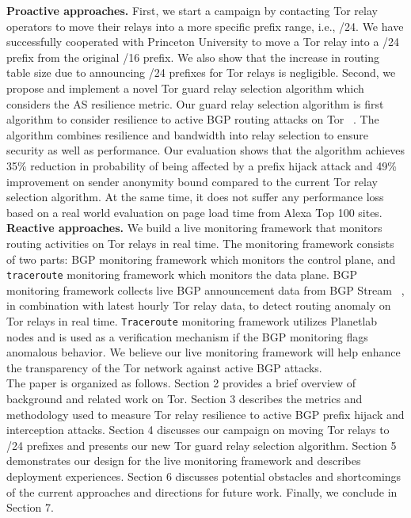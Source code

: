\textbf{Proactive approaches.} First, we start a campaign by contacting Tor relay operators to move their relays into a more specific prefix range, i.e., /24. We have successfully cooperated with Princeton University to move a Tor relay into a /24 prefix from the original /16 prefix. We also show that the increase in routing table size due to announcing /24 prefixes for Tor relays is negligible. Second, we propose and implement a novel Tor guard relay selection algorithm which considers the AS resilience metric. Our guard relay selection algorithm is first algorithm to consider resilience to active BGP routing attacks on Tor ~\cite{sun2015raptor}. The algorithm combines resilience and bandwidth into relay selection to ensure security as well as performance. Our evaluation shows that the algorithm achieves 35\% reduction in probability of being affected by a prefix hijack attack and 49\% improvement on sender anonymity bound compared to the current Tor relay selection algorithm. At the same time, it does not suffer any performance loss based on a real world evaluation on page load time from Alexa Top 100 sites. 
\\
\textbf{Reactive approaches.} We build a live monitoring framework that monitors routing activities on Tor relays in real time. The monitoring framework consists of two parts: BGP monitoring framework which monitors the control plane, and {\tt traceroute} monitoring framework which monitors the data plane. BGP monitoring framework collects live BGP announcement data from BGP Stream ~\cite{bgpstream}, in combination with latest hourly Tor relay data, to detect routing anomaly on Tor relays in real time. {\tt Traceroute}  monitoring framework utilizes Planetlab nodes and is used as a verification mechanism if the BGP monitoring flags anomalous behavior. We believe our live monitoring framework will help enhance the transparency of the Tor network against active BGP attacks.
\\
The paper is organized as follows. Section 2 provides a brief overview of background and related work on Tor.  Section 3 describes the metrics and methodology used to measure Tor relay resilience to active BGP prefix hijack and interception attacks. Section 4 discusses our campaign on moving Tor relays to /24 prefixes and presents our new Tor guard relay selection algorithm. Section 5 demonstrates our design for the live monitoring framework and describes deployment experiences. Section 6 discusses potential obstacles and shortcomings of the current approaches and directions for future work. Finally, we conclude in Section 7. 

